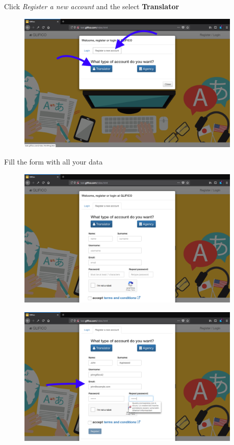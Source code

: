 \documentclass[11 pt, a4paper]{article}
\begin{document}
Click \textit{Register a new account} and the select \textbf{Translator}
\begin{figure}[H]
\centering
\includegraphics[width=0.95\textwidth]{register_translator1.png}
\end{figure}

\clearpage
Fill the form with all your data
\begin{figure}[H]
\centering
\includegraphics[width=0.95\textwidth]{register_translator2.png}
\end{figure}

\begin{figure}[H]
\centering
\includegraphics[width=0.95\textwidth]{register_translator3.png}
\end{figure}
\end{document}

